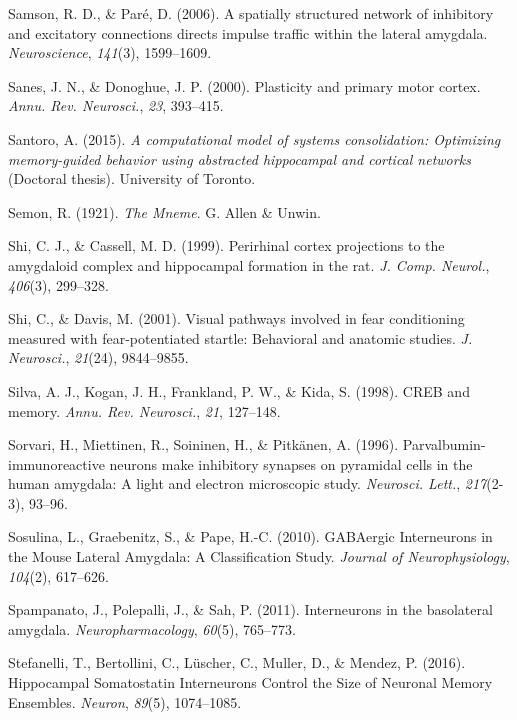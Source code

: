 \documentclass[12pt,a4paper,]{report}
\begin{document}
\hypertarget{ref-samsonux5fspatiallyux5f2006}{}
Samson, R. D., \& Paré, D. (2006). A spatially structured network of
inhibitory and excitatory connections directs impulse traffic within the
lateral amygdala. \emph{Neuroscience}, \emph{141}(3), 1599--1609.

\hypertarget{ref-sanesux5fplasticityux5f2000}{}
Sanes, J. N., \& Donoghue, J. P. (2000). Plasticity and primary motor
cortex. \emph{Annu. Rev. Neurosci.}, \emph{23}, 393--415.

\hypertarget{ref-santoroux5fcomputationalux5f2015}{}
Santoro, A. (2015). \emph{A computational model of systems
consolidation: Optimizing memory-guided behavior using abstracted
hippocampal and cortical networks} (Doctoral thesis). University of
Toronto.

\hypertarget{ref-semonux5fmnemeux5f1921}{}
Semon, R. (1921). \emph{The Mneme}. G. Allen \& Unwin.

\hypertarget{ref-shiux5fperirhinalux5f1999}{}
Shi, C. J., \& Cassell, M. D. (1999). Perirhinal cortex projections to
the amygdaloid complex and hippocampal formation in the rat. \emph{J.
Comp. Neurol.}, \emph{406}(3), 299--328.

\hypertarget{ref-shiux5fvisualux5f2001}{}
Shi, C., \& Davis, M. (2001). Visual pathways involved in fear
conditioning measured with fear-potentiated startle: Behavioral and
anatomic studies. \emph{J. Neurosci.}, \emph{21}(24), 9844--9855.

\hypertarget{ref-silvaux5fcrebux5f1998}{}
Silva, A. J., Kogan, J. H., Frankland, P. W., \& Kida, S. (1998). CREB
and memory. \emph{Annu. Rev. Neurosci.}, \emph{21}, 127--148.

\hypertarget{ref-sorvariux5fparvalbumin-immunoreactiveux5f1996}{}
Sorvari, H., Miettinen, R., Soininen, H., \& Pitkänen, A. (1996).
Parvalbumin-immunoreactive neurons make inhibitory synapses on pyramidal
cells in the human amygdala: A light and electron microscopic study.
\emph{Neurosci. Lett.}, \emph{217}(2-3), 93--96.

\hypertarget{ref-sosulinaux5fgabaergicux5f2010}{}
Sosulina, L., Graebenitz, S., \& Pape, H.-C. (2010). GABAergic
Interneurons in the Mouse Lateral Amygdala: A Classification Study.
\emph{Journal of Neurophysiology}, \emph{104}(2), 617--626.

\hypertarget{ref-spampanatoux5finterneuronsux5f2011}{}
Spampanato, J., Polepalli, J., \& Sah, P. (2011). Interneurons in the
basolateral amygdala. \emph{Neuropharmacology}, \emph{60}(5), 765--773.

\hypertarget{ref-stefanelliux5fhippocampalux5f2016}{}
Stefanelli, T., Bertollini, C., Lüscher, C., Muller, D., \& Mendez, P.
(2016). Hippocampal Somatostatin Interneurons Control the Size of
Neuronal Memory Ensembles. \emph{Neuron}, \emph{89}(5), 1074--1085.
\end{document}
